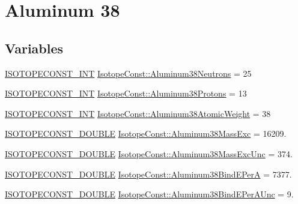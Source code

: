 \hypertarget{group___isotope_const-_aluminum-_al38}{}\section{Aluminum 38}
\label{group___isotope_const-_aluminum-_al38}
\subsection*{Variables}
\begin{DoxyCompactItemize}
\item 
\mbox{\hyperlink{group___isotope_const-_macros_ga5f18360b3e99483a35c32d789e62621c}{I\+S\+O\+T\+O\+P\+E\+C\+O\+N\+S\+T\+\_\+\+I\+NT}} \mbox{\hyperlink{group___isotope_const-_aluminum-_al38_gad4e453be0c66caef066455de527c2815}{Isotope\+Const\+::\+Aluminum38\+Neutrons}} = 25
\item 
\mbox{\hyperlink{group___isotope_const-_macros_ga5f18360b3e99483a35c32d789e62621c}{I\+S\+O\+T\+O\+P\+E\+C\+O\+N\+S\+T\+\_\+\+I\+NT}} \mbox{\hyperlink{group___isotope_const-_aluminum-_al38_ga9a0679e7ab745298be83c3b07cb16698}{Isotope\+Const\+::\+Aluminum38\+Protons}} = 13
\item 
\mbox{\hyperlink{group___isotope_const-_macros_ga5f18360b3e99483a35c32d789e62621c}{I\+S\+O\+T\+O\+P\+E\+C\+O\+N\+S\+T\+\_\+\+I\+NT}} \mbox{\hyperlink{group___isotope_const-_aluminum-_al38_gabd969290d8cfe3214ddb1680902fe2fb}{Isotope\+Const\+::\+Aluminum38\+Atomic\+Weight}} = 38
\item 
\mbox{\hyperlink{group___isotope_const-_macros_ga8f45a7272ce02c0b4c65c44636ed719a}{I\+S\+O\+T\+O\+P\+E\+C\+O\+N\+S\+T\+\_\+\+D\+O\+U\+B\+LE}} \mbox{\hyperlink{group___isotope_const-_aluminum-_al38_ga2c72c355a482f54a0aa60ff80ed2a1fb}{Isotope\+Const\+::\+Aluminum38\+Mass\+Exc}} = 16209.
\item 
\mbox{\hyperlink{group___isotope_const-_macros_ga8f45a7272ce02c0b4c65c44636ed719a}{I\+S\+O\+T\+O\+P\+E\+C\+O\+N\+S\+T\+\_\+\+D\+O\+U\+B\+LE}} \mbox{\hyperlink{group___isotope_const-_aluminum-_al38_ga95e3a23c715d73686799458962fc410f}{Isotope\+Const\+::\+Aluminum38\+Mass\+Exc\+Unc}} = 374.
\item 
\mbox{\hyperlink{group___isotope_const-_macros_ga8f45a7272ce02c0b4c65c44636ed719a}{I\+S\+O\+T\+O\+P\+E\+C\+O\+N\+S\+T\+\_\+\+D\+O\+U\+B\+LE}} \mbox{\hyperlink{group___isotope_const-_aluminum-_al38_ga38c4b29fa307384b44b71257bcb7c581}{Isotope\+Const\+::\+Aluminum38\+Bind\+E\+PerA}} = 7377.
\item 
\mbox{\hyperlink{group___isotope_const-_macros_ga8f45a7272ce02c0b4c65c44636ed719a}{I\+S\+O\+T\+O\+P\+E\+C\+O\+N\+S\+T\+\_\+\+D\+O\+U\+B\+LE}} \mbox{\hyperlink{group___isotope_const-_aluminum-_al38_gadd1aaa3229f63a45d4533a960fc17a90}{Isotope\+Const\+::\+Aluminum38\+Bind\+E\+Per\+A\+Unc}} = 9.

\end{DoxyCompactItemize}
